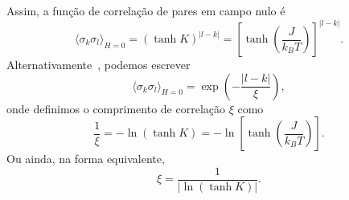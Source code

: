 \documentclass[11pt,a4paper]{article}
\begin{document}
%
Assim, a função de correlação de pares em campo nulo é
%
\begin{equation}
\boxed{
\langle \sigma_k \sigma_l \rangle_{H=0}
= \left( \tanh K \right)^{|l-k|}
= \left[ \tanh\left( \frac{J}{k_B T} \right) \right]^{|l-k|}
}.
\label{eq:correlacao_h0}
\end{equation}
%
Alternativamente~\cite{salinas}, podemos escrever
%
\begin{equation}
\langle \sigma_k \sigma_l \rangle_{H=0}
= \exp\left( - \frac{|l-k|}{\xi} \right),
\end{equation}
%
onde definimos o comprimento de correlação $\xi$ como
%
\begin{equation}
\boxed{
\frac{1}{\xi} = - \ln( \tanh K )
= - \ln\left[ \tanh\left( \frac{J}{k_B T} \right) \right]
}.
\label{eq:comprimento_correlacao}
\end{equation}
%
Ou ainda, na forma equivalente,
%
\begin{equation}
\boxed{
\xi = \frac{1}{ |\ln(\tanh K)| }.
}
\label{eq:xi_forma2}
\end{equation}
%
\end{document}

